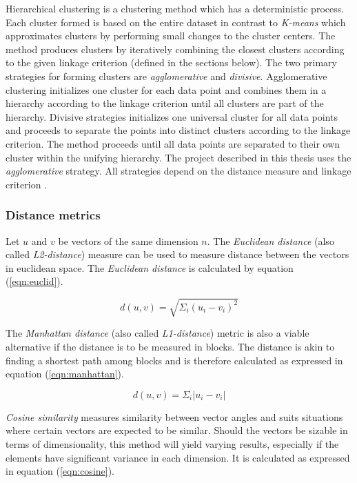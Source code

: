 Hierarchical clustering is a clustering method which has a deterministic process. Each cluster formed is based on the entire dataset in contrast to \textit{K-means} which approximates clusters by performing small changes to the cluster centers. The method produces clusters by iteratively combining the closest clusters according to the given linkage criterion (defined in the sections below). The two primary strategies for forming clusters are \textit{agglomerative} and \textit{divisive}. Agglomerative clustering initializes one cluster for each data point and combines them in a hierarchy according to the linkage criterion until all clusters are part of the hierarchy. Divisive strategies initializes one universal cluster for all data points and proceeds to separate the points into distinct clusters according to the linkage criterion. The method proceeds until all data points are separated to their own cluster within the unifying hierarchy. The project described in this thesis uses the \textit{agglomerative} strategy. All strategies depend on the distance measure and linkage criterion \cite{murtagh1983survey}.

\subsubsection{Distance metrics}
Let $u$ and $v$ be vectors of the same dimension $n$. The \textit{Euclidean distance} (also called \textit{L2-distance}) measure can be used to measure distance between the vectors in euclidean space. The \textit{Euclidean distance} is calculated by equation (\ref{eqn:euclid}).

\begin{equation}
\label{eqn:euclid}
d(u, v) = \sqrt{\Sigma_i (u_i - v_i)^2} 
\end{equation}

The \textit{Manhattan distance} (also called \textit{L1-distance}) metric is also a viable alternative if the distance is to be measured in blocks. The distance is akin to finding a shortest path among blocks and is therefore calculated as expressed in equation (\ref{eqn:manhattan}).

\begin{equation}
\label{eqn:manhattan}
d(u, v) = \Sigma_i |u_i - v_i|
\end{equation}

\textit{Cosine similarity} measures similarity between vector angles and suits situations where certain vectors are expected to be similar. Should the vectors be sizable in terms of dimensionality, this method will yield varying results, especially if the elements have significant variance in each dimension. It is calculated as expressed in equation (\ref{eqn:cosine}).

